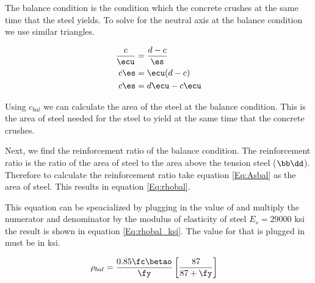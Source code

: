 The balance condition is the condition which the concrete crushes at the same time that the steel yields. To solve for the neutral axis at the balance condition we use similar triangles.

\begin{align}
	\frac{c}{\ecu} &= \frac{d-c}{\es}\\ 
	c \es &= \ecu(d-c)\\ 
	c \es &= d\ecu -c\ecu
\end{align}


Using $c_{bal}$ we can calculate the area of the steel \As at the balance condition. This is the area of steel needed for the steel to yield at the same time that the concrete crushes.


Next, we find the reinforcement ratio of the balance condition. The reinforcement ratio is the ratio of the area of steel to the area above the tension steel ($\bb\dd$). Therefore to calculate the reinforcement ratio take equation \ref{Eq:Asbal} as the area of steel. This results in equation \ref{Eq:rhobal}.


This equation can be speacialized by plugging in the value of \ecu and multiply the numerator and denominator by the modulus of elasticity of steel $E_s=29000$ ksi the result is shown in equation \ref{Eq:rhobal_ksi}. The value for \fy that is plugged in must be in ksi. 

\begin{align}
	\rho_{bal}
	&= 
	\frac{0.85\fc\betao}{\fy}
	\left[
		\frac{87}{87+\fy}
	\right]
	\label{Eq:rhobal_ksi}
\end{align}






